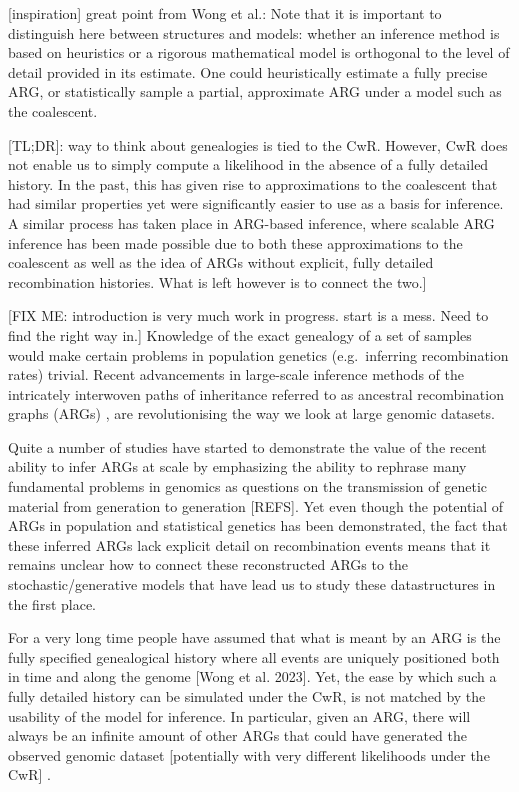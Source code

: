\documentclass{article}
\begin{document}
[inspiration] great point from Wong et al.:
Note that it is important to distinguish here between structures and models:
whether an inference method is based on
heuristics or a rigorous mathematical model is orthogonal to the level
of detail provided in its estimate. One could heuristically estimate a
fully precise ARG, or statistically sample a partial, approximate ARG under
a model such as the coalescent.

[TL;DR]: way to think about genealogies is tied to the CwR. However,
CwR does not enable us to simply compute a likelihood in the absence of a fully
detailed history. In the past, this has given rise to approximations to the
coalescent that had similar properties yet were significantly easier to use
as a basis for inference.
A similar process has taken place in ARG-based inference,
where scalable ARG inference has been made possible due to both these approximations
to the coalescent as well as the idea of ARGs without explicit, fully detailed
recombination histories. What is left however is to connect the two.]


[FIX ME: introduction is very much work in progress.
start is a mess. Need to find the right way in.]
Knowledge of the exact genealogy of a set of samples would make certain problems
in population genetics (e.g.\ inferring recombination rates) trivial.
Recent advancements in large-scale inference methods of the intricately
interwoven paths of inheritance referred to as ancestral recombination graphs (ARGs)
\citep{rasmussen_genome-wide_2014, heine_bridging_2018,
kelleher_inferring_2019, speidel_method_2019, rasmussen_espalier_2022, zhang_biobank-scale_2023},
are revolutionising the way we look at large genomic datasets.

Quite a number of studies have started to demonstrate the value of the recent ability to
infer ARGs at scale by emphasizing the ability to rephrase many fundamental problems
in genomics as questions on the transmission of genetic material from generation
to generation [REFS].
Yet even though the potential of ARGs in population and statistical genetics has
been demonstrated, the fact that these inferred ARGs lack explicit detail on
recombination events means that it remains unclear how to connect these
reconstructed ARGs to the stochastic/generative models that have lead us
to study these datastructures in the first place.

For a very long time people have assumed that what is meant by an ARG is the
fully specified genealogical history where all events are uniquely positioned
both in time and along the genome [Wong et al. 2023].
Yet, the ease by which such a fully detailed history can be simulated under the
CwR, is not matched by the usability of the model for inference.
In particular, given an ARG, there will always be an infinite amount of other
ARGs that could have generated the observed genomic dataset
[potentially with very different likelihoods under the CwR]
\citep{mcvean_approximating_2005}.
\end{document}
